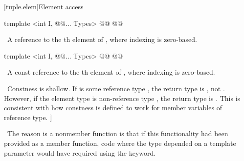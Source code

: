 \documentclass[american,twoside]{book}
\begin{document}
[tuple.elem]{Element access}

%
%
\begin{itemdecl}
template <int I, @@... Types> 
  @@
  @@
\end{itemdecl}

\begin{itemdescr}
\pnum
{}

\pnum
{}

\pnum
\returns\  A reference to the th element of , where
indexing is zero-based.
\end{itemdescr}

%
%
\begin{itemdecl}
template <int I, @@... Types> 
  @@
  @@
\end{itemdecl}

\begin{itemdescr}
\pnum
{}

\pnum
{}

\pnum
\returns\  A const reference to the th element of , where
indexing is zero-based.

\pnum
\enternote\ Constness is shallow. If  is some
reference type , the return type is , not .
However, if the element type is non-reference type , the return
type is .
This is consistent with how constness is defined to work 
for member variables of reference type. \exitnote]

\pnum
\enternote\ The reason  is a
nonmember function is that if this functionality had been
provided as a member function, code where the type
depended on a template parameter would have required using
the  keyword. \exitnote\
\end{itemdescr}
\end{document}
